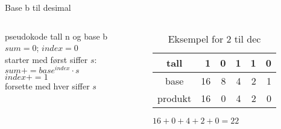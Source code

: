 \begin{frame}[fragile]{Base b til desimal}
\begin{columns}
    \begin{column}{0.30\textwidth}
\begin{block}{pseudokode}
    tall n og base b\\
    $sum=0$; $index=0$\\
    starter med først siffer $s$:\\
    $sum+=base^{index}\cdot s$\\
    $index+=1$\\
    forsette med hver siffer $s$
\end{block}
 	\end{column}
 	\pause
    \begin{column}{0.66\textwidth}
\begin{table}
\begin{tabular}{c|r|r|r|r|r}
    tall & 1 & 0 & 1 & 1 & 0 \\ \hline
    base & 16 & 8 & 4 & 2 & 1 \\ \hline
    produkt & 16 & 0 & 4 & 2 & 0 
\end{tabular}
\caption{Eksempel for 2 til dec}
\end{table}
\begin{center}
$16+0+4+2+0=22$    
\end{center}

 	\end{column}
 	\end{columns}
\end{frame}